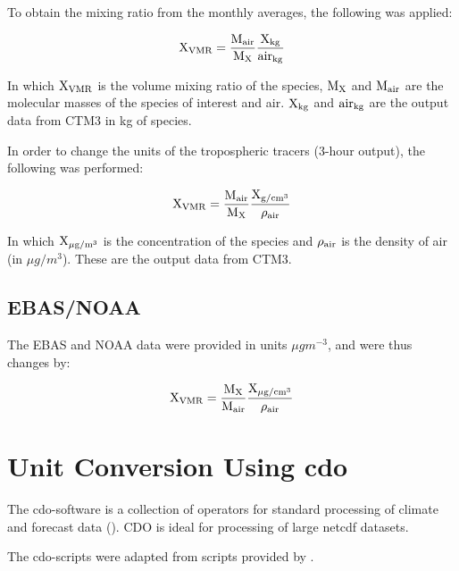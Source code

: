 To obtain the mixing ratio from the monthly averages, the following was applied:

\begin{equation}
    \mathrm{X_{VMR}} = \frac{\mathrm{M_{air}}}{\mathrm{M_{X}}}\frac{\mathrm{X_{kg}}}{\mathrm{air_{kg}}}
    \label{eq:vmr_monthly_avg}
\end{equation}

In which $\mathrm{X_{VMR}}$ is the volume mixing ratio of the species, $\mathrm{M_X}$ and $\mathrm{M_{air}}$ are the molecular masses of the species of interest and air. $\mathrm{X_{kg}}$ and $\mathrm{air_{kg}}$ are the output data from CTM3 in kg of species. 

\medskip

In order to change the units of the tropospheric tracers (3-hour output), the following was performed: 

\begin{equation}
    \mathrm{X_{VMR}} = \frac{\mathrm{M_{air}}}{\mathrm{M_{X}}}\frac{\mathrm{X_{ g/cm^{3}}}}{\mathrm{\rho_{air}}}
    \label{eq:vmr_trop_tracer}
\end{equation}

In which  $\mathrm{X_{\mu g/m^{3}}}$ is the concentration of the species and $\mathrm{\rho_{air}}$ is the density of air (in $\mu g/m^{3}$). These are the output data from CTM3.


\subsection{EBAS/NOAA}\label{sec:unit_conversion_EBASNOAA}

The EBAS and NOAA data were provided in units $\mu g m^{-3}$, and were thus changes by: 

\begin{equation}
    \mathrm{X_{VMR}} = \frac{\mathrm{M_X}}{\mathrm{M_{air}}}\frac{\mathrm{X_{\mu g/cm^{3}}}}{\mathrm{\rho_{air}}}
\end{equation}

\section{Unit Conversion Using cdo}\label{sec:cdo}

The \acrshort{cdo}-software is a collection of operators for standard processing of climate and forecast data (\cite{cdo}). CDO is ideal for processing of large \acrshort{netcdf} datasets. 


\medskip

The \acrshort{cdo}-scripts were adapted from scripts provided by \cite{StefaniePersonal}. 

